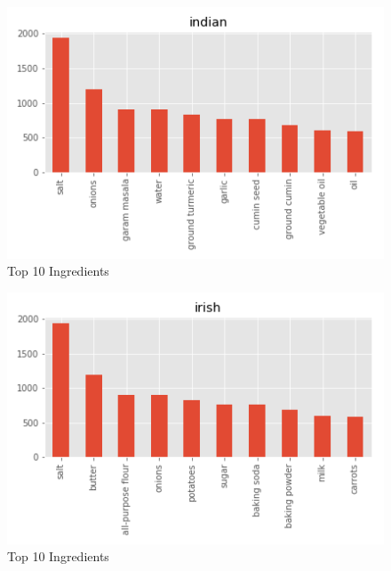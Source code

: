 \documentclass[sigconf]{acmart}
\begin{document}
\begin{figure}[!ht]
  \centering\includegraphics[width=\columnwidth]{images/indian_10_most_used_ingredients.png}
  \caption{Top 10 Ingredients }\label{f:indian_10_most_used_ingredients}
\end{figure}

\begin{figure}[!ht]
  \centering\includegraphics[width=\columnwidth]{images/irish_10_most_used_ingredients.png}
  \caption{Top 10 Ingredients }\label{f:irish_10_most_used_ingredients}
\end{figure}
\end{document}
